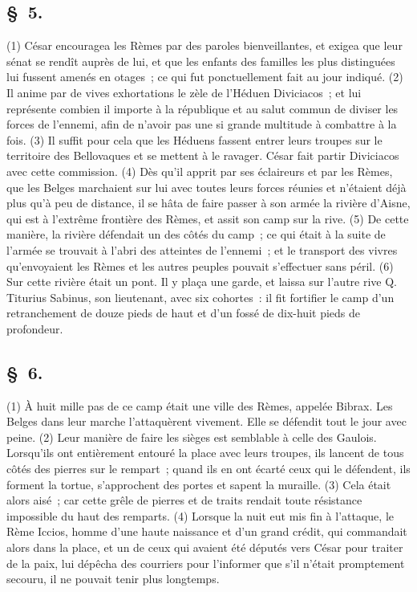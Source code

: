 \documentclass[french,twoside]{book} %
\begin{document}
\subsection[{§ 5.}]{ \textsc{§ 5.} }
\noindent (1) César encouragea les Rèmes par des paroles bienveillantes, et exigea que leur sénat se rendît auprès de lui, et que les enfants des familles les plus distinguées lui fussent amenés en otages ; ce qui fut ponctuellement fait au jour indiqué. (2) Il anime par de vives exhortations le zèle de l’Héduen Diviciacos ; et lui représente combien il importe à la république et au salut commun de diviser les forces de l’ennemi, afin de n’avoir pas une si grande multitude à combattre à la fois. (3) Il suffit pour cela que les Héduens fassent entrer leurs troupes sur le territoire des Bellovaques et se mettent à le ravager. César fait partir Diviciacos avec cette commission. (4) Dès qu’il apprit par ses éclaireurs et par les Rèmes, que les Belges marchaient sur lui avec toutes leurs forces réunies et n’étaient déjà plus qu’à peu de distance, il se hâta de faire passer à son armée la rivière d’Aisne, qui est à l’extrême frontière des Rèmes, et assit son camp sur la rive. (5) De cette manière, la rivière défendait un des côtés du camp ; ce qui était à la suite de l’armée se trouvait à l’abri des atteintes de l’ennemi ; et le transport des vivres qu’envoyaient les Rèmes et les autres peuples pouvait s’effectuer sans péril. (6) Sur cette rivière était un pont. Il y plaça une garde, et laissa sur l’autre rive Q. Titurius Sabinus, son lieutenant, avec six cohortes : il fit fortifier le camp d’un retranchement de douze pieds de haut et d’un fossé de dix-huit pieds de profondeur.
\subsection[{§ 6.}]{ \textsc{§ 6.} }
\noindent (1) À huit mille pas de ce camp était une ville des Rèmes, appelée Bibrax. Les Belges dans leur marche l’attaquèrent vivement. Elle se défendit tout le jour avec peine. (2) Leur manière de faire les sièges est semblable à celle des Gaulois. Lorsqu’ils ont entièrement entouré la place avec leurs troupes, ils lancent de tous côtés des pierres sur le rempart ; quand ils en ont écarté ceux qui le défendent, ils forment la tortue, s’approchent des portes et sapent la muraille. (3) Cela était alors aisé ; car cette grêle de pierres et de traits rendait toute résistance impossible du haut des remparts. (4) Lorsque la nuit eut mis fin à l’attaque, le Rème Iccios, homme d’une haute naissance et d’un grand crédit, qui commandait alors dans la place, et un de ceux qui avaient été députés vers César pour traiter de la paix, lui dépêcha des courriers pour l’informer que s’il n’était promptement secouru, il ne pouvait tenir plus longtemps.
\end{document}

